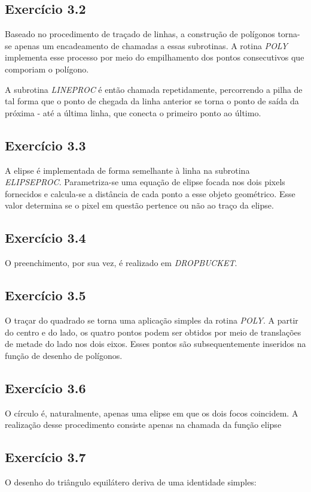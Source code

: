 \documentclass[12pt, a4paper, twoside]{article}
\begin{document}
\subsection{Exercício 3.2}

Baseado no procedimento de traçado de linhas, a construção de polígonos torna-se apenas um encadeamento de chamadas a essas subrotinas. A rotina \textit{POLY} implementa esse processo por meio do empilhamento dos pontos consecutivos que comporiam o polígono. 

A subrotina \textit{LINEPROC} é então chamada repetidamente, percorrendo a pilha de tal forma que o ponto de chegada da linha anterior se torna o ponto de saída da próxima - até a última linha, que conecta o primeiro ponto ao último.

\subsection{Exercício 3.3}

A elipse é implementada de forma semelhante à linha na subrotina \textit{ELIPSEPROC}. Parametriza-se uma equação de elipse focada nos dois pixels fornecidos e calcula-se a distância de cada ponto a esse objeto geométrico. Esse valor determina se o pixel em questão pertence ou não ao traço da elipse.

\subsection{Exercício 3.4}

O preenchimento, por sua vez, é realizado em \textit{DROPBUCKET}. 

\subsection{Exercício 3.5}
O traçar do quadrado se torna uma aplicação simples da rotina \textit{POLY}. A partir do centro e do lado, os quatro pontos podem ser obtidos por meio de translações de metade do lado nos dois eixos. Esses pontos são subsequentemente inseridos na função de desenho de polígonos.

\subsection{Exercício 3.6}
O círculo é, naturalmente, apenas uma elipse em que os dois focos coincidem. A realização desse procedimento consiste apenas na chamada da função elipse

\subsection{Exercício 3.7}
O desenho do triângulo equilátero deriva de uma identidade simples:
\end{document}
